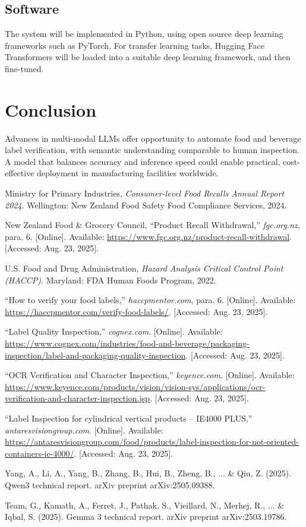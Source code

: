 \documentclass[conference]{IEEEtran}
\begin{document}
\subsection{Software}
The system will be implemented in Python, using open source deep learning frameworks such as PyTorch. For transfer learning tasks, Hugging Face Transformers will be loaded into a suitable deep learning framework, and then fine-tuned.

\section{Conclusion}

Advances in multi-modal LLMs offer opportunity to automate food and beverage label verification, with semantic understanding comparable to human inspection. A model that balances accuracy and inference speed could enable practical, cost-effective deployment in manufacturing facilities worldwide.

\begin{thebibliography}{1}
Ministry for Primary Industries, \emph{Consumer-level Food Recalls Annual Report 2024}. Wellington: New Zealand Food Safety Food Compliance Services, 2024.

New Zealand Food \& Grocery Council, “Product Recall Withdrawal,” \emph{fgc.org.nz}, para. 6. [Online]. Available: \url{https://www.fgc.org.nz/product-recall-withdrawal}. [Accessed: Aug. 23, 2025].

U.S. Food and Drug Administration, \emph{Hazard Analysis Critical Control Point (HACCP)}. Maryland: FDA Human Foods Program, 2022.

“How to verify your food labels,” \emph{haccpmentor.com}, para. 6. [Online]. Available: \url{https://haccpmentor.com/verify-food-labels/}. [Accessed: Aug. 23, 2025].

“Label Quality Inspection,” \emph{cognex.com}. [Online]. Available: \url{https://www.cognex.com/industries/food-and-beverage/packaging-inspection/label-and-packaging-quality-inspection}. [Accessed: Aug. 23, 2025].

“OCR Verification and Character Inspection,” \emph{keyence.com}. [Online]. Available: \url{https://www.keyence.com/products/vision/vision-sys/applications/ocr-verification-and-character-inspection.jsp}. [Accessed: Aug. 23, 2025].

“Label Inspection for cylindrical vertical products – IE4000 PLUS,” \emph{antaresvisiongroup.com}. [Online]. Available: \url{https://antaresvisiongroup.com/food/products/label-inspection-for-not-oriented-containers-ie-4000/}. [Accessed: Aug. 23, 2025].

Yang, A., Li, A., Yang, B., Zhang, B., Hui, B., Zheng, B., ... & Qiu, Z. (2025). Qwen3 technical report. arXiv preprint arXiv:2505.09388.

Team, G., Kamath, A., Ferret, J., Pathak, S., Vieillard, N., Merhej, R., ... & Iqbal, S. (2025). Gemma 3 technical report. arXiv preprint arXiv:2503.19786.

\end{thebibliography}
\end{document}
